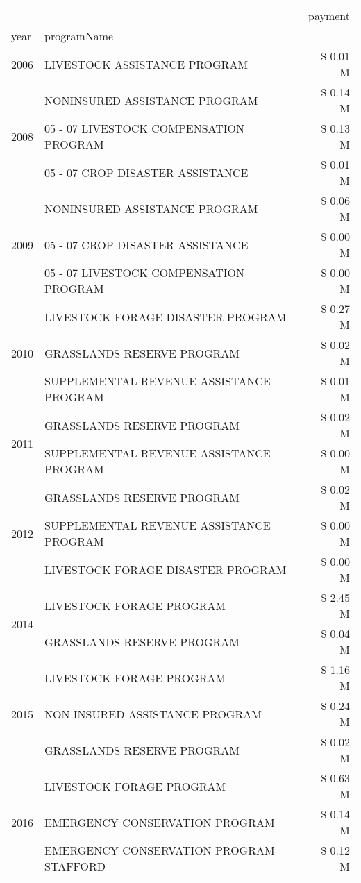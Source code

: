 \begin{tabular}{llr}
\toprule
 &  & payment \\
year & programName &  \\
\midrule
2006 & LIVESTOCK ASSISTANCE PROGRAM & \$ 0.01 M \\
\cline{1-3}
\multirow[t]{3}{*}{2008} & NONINSURED ASSISTANCE PROGRAM & \$ 0.14 M \\
 & 05 - 07 LIVESTOCK COMPENSATION PROGRAM & \$ 0.13 M \\
 & 05 - 07 CROP DISASTER ASSISTANCE & \$ 0.01 M \\
\cline{1-3}
\multirow[t]{3}{*}{2009} & NONINSURED ASSISTANCE PROGRAM & \$ 0.06 M \\
 & 05 - 07 CROP DISASTER ASSISTANCE & \$ 0.00 M \\
 & 05 - 07 LIVESTOCK COMPENSATION PROGRAM & \$ 0.00 M \\
\cline{1-3}
\multirow[t]{3}{*}{2010} & LIVESTOCK FORAGE DISASTER  PROGRAM & \$ 0.27 M \\
 & GRASSLANDS RESERVE PROGRAM & \$ 0.02 M \\
 & SUPPLEMENTAL REVENUE ASSISTANCE PROGRAM & \$ 0.01 M \\
\cline{1-3}
\multirow[t]{2}{*}{2011} & GRASSLANDS RESERVE PROGRAM & \$ 0.02 M \\
 & SUPPLEMENTAL REVENUE ASSISTANCE PROGRAM & \$ 0.00 M \\
\cline{1-3}
\multirow[t]{3}{*}{2012} & GRASSLANDS RESERVE PROGRAM & \$ 0.02 M \\
 & SUPPLEMENTAL REVENUE ASSISTANCE PROGRAM & \$ 0.00 M \\
 & LIVESTOCK FORAGE DISASTER PROGRAM & \$ 0.00 M \\
\cline{1-3}
\multirow[t]{2}{*}{2014} & LIVESTOCK FORAGE PROGRAM & \$ 2.45 M \\
 & GRASSLANDS RESERVE PROGRAM & \$ 0.04 M \\
\cline{1-3}
\multirow[t]{3}{*}{2015} & LIVESTOCK FORAGE PROGRAM & \$ 1.16 M \\
 & NON-INSURED ASSISTANCE PROGRAM & \$ 0.24 M \\
 & GRASSLANDS RESERVE PROGRAM & \$ 0.02 M \\
\cline{1-3}
\multirow[t]{3}{*}{2016} & LIVESTOCK FORAGE PROGRAM                      & \$ 0.63 M \\
 & EMERGENCY CONSERVATION PROGRAM                & \$ 0.14 M \\
 & EMERGENCY CONSERVATION PROGRAM STAFFORD       & \$ 0.12 M \\

\end{tabular}
